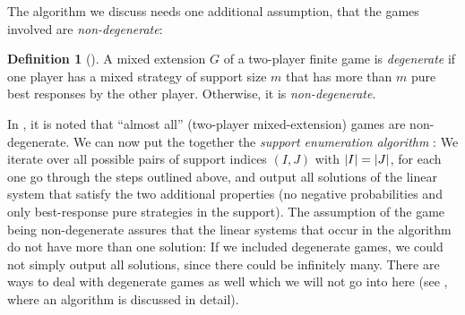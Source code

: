 \documentclass[a4paper,DIV=11,abstracton,twoside=semi]{scrreprt}
\theoremstyle{definition}
\newtheorem{defn}[thm]{Definition} %
\begin{document}
    The algorithm we discuss needs one additional assumption, that the games involved are \emph{non-degenerate}:
    \begin{defn}[{\cite[Definition 3.2]{bib:nisanAlgorithmicGameTheoryCh3EquilibriumComputation}}]
        A mixed extension $G$ of a two-player finite game is \emph{degenerate} if one player has a mixed strategy of support size $m$ that has more than $m$ pure best responses by the other player. Otherwise, it is \emph{non-degenerate}.
        \label{def:degenerateRealValuedGame}
    \end{defn}
    In \cite[p.54]{bib:nisanAlgorithmicGameTheoryCh3EquilibriumComputation}, it is noted that “almost all” (two-player mixed-extension) games are non-degenerate.
    We can now put the together the \emph{support enumeration algorithm} \cite[Algorithm 3.4]{bib:nisanAlgorithmicGameTheoryCh3EquilibriumComputation}: We iterate over all possible pairs of support indices $(I, J)$ with $\left| I \right| = \left| J \right|$, for each one go through the steps outlined above, and output all solutions of the linear system that satisfy the two additional properties (no negative probabilities and only best-response pure strategies in the support). 
    The assumption of the game being non-degenerate assures that the linear systems that occur in the algorithm do not have more than one solution: If we included degenerate games, we could not simply output all solutions, since there could be infinitely many.
    There are ways to deal with degenerate games as well which we will not go into here (see \cite[p.65]{bib:nisanAlgorithmicGameTheoryCh3EquilibriumComputation}, where an algorithm is discussed in detail).
    
\end{document}
